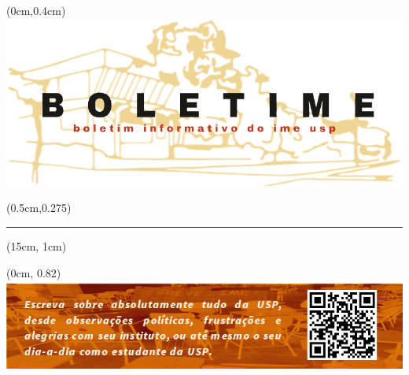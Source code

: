 
\begin{textblock*}{\paperwidth}(0cm,0.4cm)
    \centering
    \includegraphics[width=0.95\paperwidth]{img/boletime_cabecalho.png}\\
\end{textblock*}

\begin{textblock*}{\paperwidth}(0.5cm,0.275\paperheight)
    \\    
    \textcolor{vermelho_camat}{\rule{0.95\paperwidth}{0.25cm}} %
\end{textblock*}

\begin{textblock*}{5cm}(15cm, 1cm)
    \raggedleft 
    {\huge {}}
\end{textblock*}

\vspace*{0.2\paperheight}

\begin{multicols}{2}
    
\end{multicols}

\begin{textblock*}{\paperwidth}(0cm, 0.82\paperheight)
    \centering
    \includegraphics[width=0.95\paperwidth]{img/qr_code.png}
\end{textblock*}